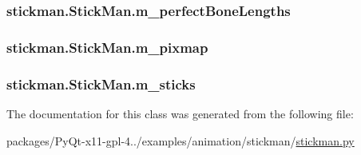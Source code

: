 \subsubsection[{m\+\_\+perfect\+Bone\+Lengths}]{\setlength{\rightskip}{0pt plus 5cm}stickman.\+Stick\+Man.\+m\+\_\+perfect\+Bone\+Lengths}\label{classstickman_1_1StickMan_ac7b1efda8c767512085e1d72ff361510}
\hypertarget{classstickman_1_1StickMan_a230dd782b821b463f9d3572fa546c12d}{}
\subsubsection[{m\+\_\+pixmap}]{\setlength{\rightskip}{0pt plus 5cm}stickman.\+Stick\+Man.\+m\+\_\+pixmap}\label{classstickman_1_1StickMan_a230dd782b821b463f9d3572fa546c12d}
\hypertarget{classstickman_1_1StickMan_a15e1ada8fb0700860db0afa14de846ad}{}
\subsubsection[{m\+\_\+sticks}]{\setlength{\rightskip}{0pt plus 5cm}stickman.\+Stick\+Man.\+m\+\_\+sticks}\label{classstickman_1_1StickMan_a15e1ada8fb0700860db0afa14de846ad}


The documentation for this class was generated from the following file\+:\begin{DoxyCompactItemize}
\item 
packages/\+Py\+Qt-\/x11-\/gpl-\/4../examples/animation/stickman/\hyperlink{stickman_8py}{stickman.\+py}\end{DoxyCompactItemize}
